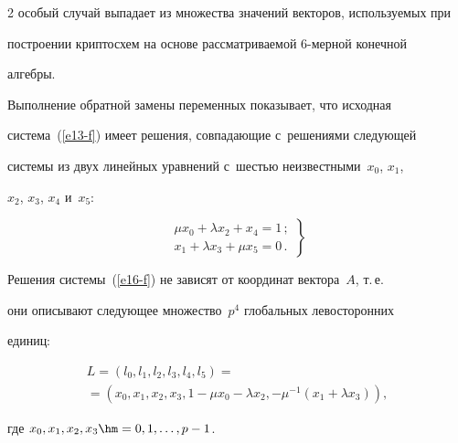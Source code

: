 \begin{multicols}{2}
особый случай выпадает из множества значений векторов, используемых при 


построении криптосхем на основе рассматриваемой 6-мер\-ной конечной 


алгебры.


  


  Выполнение обратной замены переменных показывает, что исходная 


система~(\ref{e13-f}) имеет решения, совпадающие с~решениями следующей 


системы из двух линейных уравнений с~шестью неизвестными~$x_0$, $x_1$, 


$x_2$, $x_3$, $x_4$ и~$x_5$:


  \begin{equation}


  \left.


  \begin{matrix}


  \mu x_0+\lambda x_2+x_4=1\,;\\


  x_1+\lambda x_3+\mu x_5=0\,.


  \end{matrix}


  \right\}


  \label{e16-f}


  \end{equation}


  


  Решения системы~(\ref{e16-f}) не зависят от координат вектора~$A$, т.\,е.\ 


они описывают следующее множество~$p^4$ глобальных левосторонних 


единиц:


  \begin{multline}


  L=\left( l_0, l_1, l_2, l_3, l_4, l_5\right)={}\\


  \!\!\!=\left( x_0, x_1, x_2, x_3, 1\!-\!\mu x_0\!-\!


\lambda x_2, -\mu^{-1}(x_1\!+\!\lambda x_3)\right),\!\!\!\!


  \label{e17-f}


  \end{multline}


где $x_0, x_1, x_2, x_3 \hm=0, 1, \ldots ,  p-1$.



\end{multicols}
